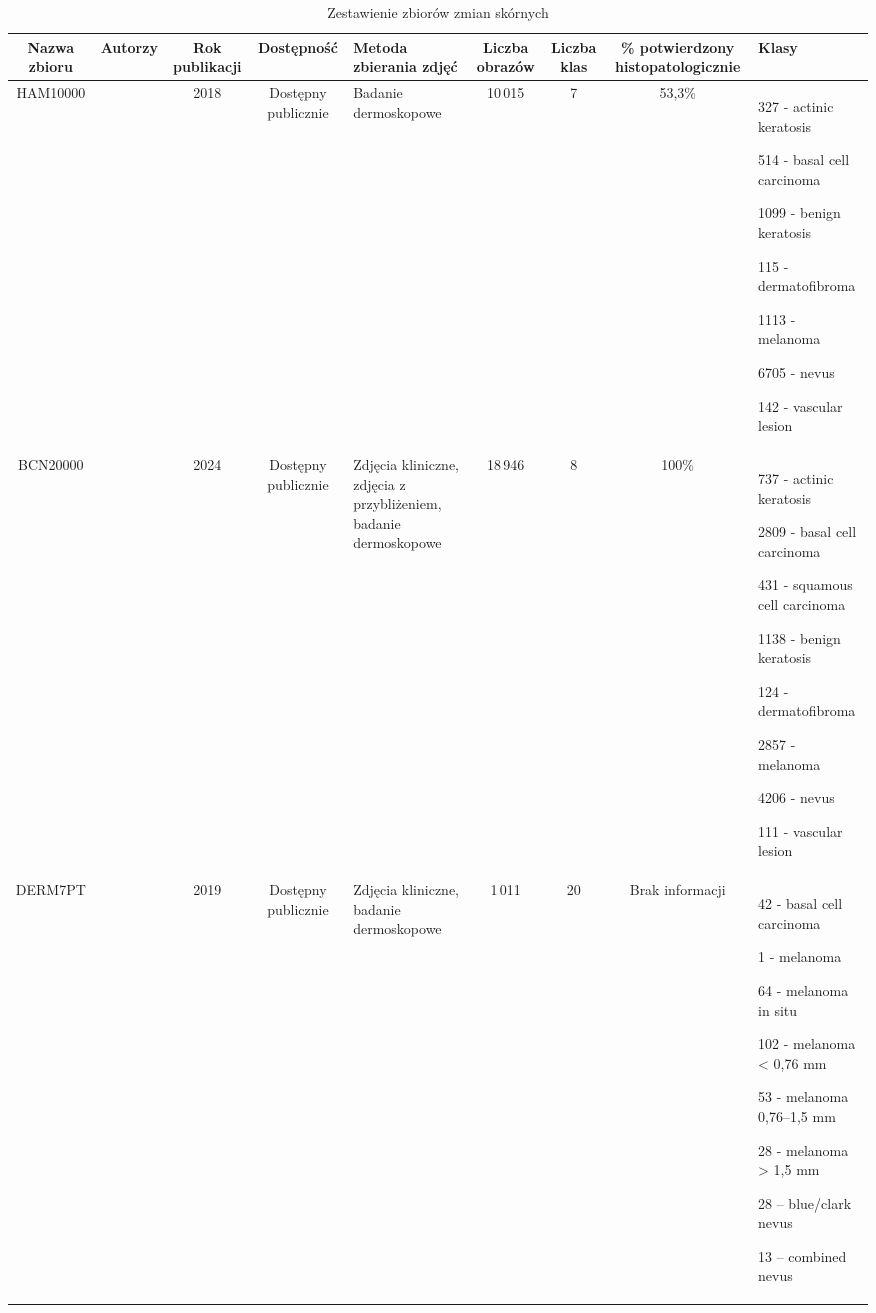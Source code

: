\begin{table}
	\tiny
	\caption{Zestawienie zbiorów zmian skórnych}
	\centering
	\begin{tabular}{|c|c|c|c|p{2cm}|c|c|c|p{3cm}|}
		\hline
		\textbf{Nazwa zbioru} &
		\textbf{Autorzy} &
		\textbf{Rok publikacji} &
		\textbf{Dostępność} &
		\textbf{Metoda zbierania zdjęć} &
		\textbf{Liczba obrazów} &
		\textbf{Liczba klas} &
		\textbf{\% potwierdzony histopatologicznie} &
		\textbf{Klasy} \\ \hline
		
		HAM10000 & \cite{Kittler_2018} & 2018 & Dostępny publicznie & Badanie dermoskopowe & 10\,015 & 7 & 53,3\% &
		327 - actinic keratosis
		
		514 - basal cell carcinoma
		
		1099 - benign keratosis
		
		115 - dermatofibroma
		
		1113 - melanoma
		
		6705 - nevus
		
		142 - vascular lesion \\ \hline
		
		BCN20000 & \cite{Hernández2024} & 2024 & Dostępny publicznie & Zdjęcia kliniczne, zdjęcia z przybliżeniem, badanie dermoskopowe & 18\,946 & 8 & 100\% &
		737 - actinic keratosis
		
		2809 - basal cell carcinoma
		
		431 - squamous cell carcinoma
		
		1138 - benign keratosis
		
		124 - dermatofibroma
		
		2857 - melanoma
		
		4206 - nevus
		
		111 - vascular lesion \\ \hline
		
		DERM7PT & \cite{Hamarneh_2019} & 2019 & Dostępny publicznie & Zdjęcia kliniczne, badanie dermoskopowe & 1\,011 & 20 & Brak informacji &
		42 - basal cell carcinoma
		
		
		1 - melanoma
		
		64 - melanoma in situ
		
		102 - melanoma < 0{,}76 mm
		
		53 - melanoma 0{,}76–1{,}5 mm
		
		28 - melanoma > 1{,}5 mm
		
		
		28 – blue/clark nevus
		
		13 – combined nevus
		

\end{tabular}
\end{table}
